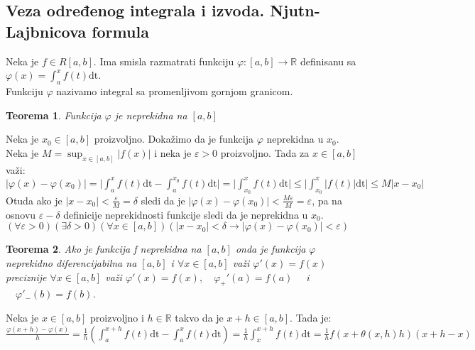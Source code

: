 \documentclass{article}
\newtheorem{teorema}{Teorema}[section]
\begin{document}
\subsection{Veza određenog integrala i izvoda. Njutn-Lajbnicova formula}
Neka je $f \in R[a, b]$. Ima smisla razmatrati funkciju $\varphi:[a, b] \longrightarrow \mathbb{R}$ definisanu sa $\varphi (x) = \displaystyle \int^x_a f(t)\text{dt}$.\\
Funkciju $\varphi$ nazivamo integral sa promenljivom gornjom granicom.
\begin{teoremabox}
    \begin{teorema}
        Funkcija $\varphi$ je neprekidna na $[a, b]$
    \end{teorema}
\end{teoremabox}
Neka je $x_0 \in [a ,b]$ proizvoljno. Dokažimo da je funkcija $\varphi$ neprekidna u $x_0$. Neka je $M = \displaystyle \sup_{x\in[a,b]} | f(x) |$ i neka je $\varepsilon > 0$ proizvoljno. Tada za $x\in[a,b]$ važi:\\
$\displaystyle |\varphi(x) - \varphi(x_0)| = \bigg|\int^x_a f(t)\text{dt} - \int^{x_0}_a f(t)\text{dt}\bigg| = \bigg|\int^x_{x_0}f(t)\text{dt}\bigg| \leq \bigg|\int^x_{x_0}|f(t)|\text{dt}\bigg| \leq M|x - x_0|$\\
Otuda ako je $|x-x_0| < \frac{\varepsilon}{M} = \delta$ sledi da je $|\varphi(x) - \varphi(x_0)| < \frac{M\varepsilon}{M} = \varepsilon$, pa na osnovu $\varepsilon - \delta$ definicije neprekidnosti funkcije sledi da je neprekidna u $x_0$.\\
$\displaystyle (\forall \varepsilon > 0)(\exists \delta > 0)(\forall x\in [a, b])(|x-x_0| < \delta \longrightarrow |\varphi(x) - \varphi(x_0)| < \varepsilon)$
\begin{teoremabox}
    \begin{teorema}
        Ako je funkcija f neprekidna na $[a, b]$ onda je funkcija $\varphi$ neprekidno diferencijabilna na $[a, b]$ i $\forall x \in [a, b]$ važi $\varphi'(x) = f(x)$ preciznije $\forall x \in [a, b]$ važi $\varphi'(x) = f(x),\quad \varphi_+'(a) = f(a)\quad$ i $\quad \varphi'_-(b) = f(b)$.
    \end{teorema}
\end{teoremabox}
Neka je $x \in [a, b]$ proizvoljno i $h \in \mathbb{R}$ takvo da je $x+h\in[a,b]$. Tada  je:\\
$\frac{\varphi(x+h) - \varphi(x)}{h} = \frac{1}{h} (\displaystyle \int^{x+h}_a f(t)\text{dt} - \int^x_a f(t)\text{dt}) = \frac{1}{h} \int^{x+h}_x f(t)\text{dt} = \frac{1}{h} f(x+\theta(x,h)h)(x+h-x)$\\
\end{document}
